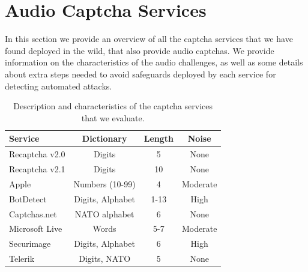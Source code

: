 \section{Audio Captcha Services}
\label{sec:services}

In this section we provide an overview of all the captcha services that we have found deployed in the wild,
that also provide audio captchas. We provide information on the characteristics of the audio challenges, as
well as some details about extra steps needed to avoid safeguards deployed by each service for 
detecting automated attacks.


\begin{table}[t]
\centering
\caption{Description and characteristics of the captcha services that we evaluate.}
\begin{tabular}{lccc}
\toprule
\textbf{Service}& \textbf{Dictionary}& \textbf{Length} & \textbf{Noise} \\
\hline
Recaptcha v2.0 & Digits & 5 & None \\
\rowcolor{Gray}
Recaptcha v2.1 & Digits & 10 & None \\
Apple & Numbers (10-99) & 4 & Moderate\\
\rowcolor{Gray}
BotDetect & Digits, Alphabet & 1-13 & High \\
Captchas.net & NATO alphabet & 6 & None \\
\rowcolor{Gray}
Microsoft Live & Words & 5-7 & Moderate \\
Securimage & Digits, Alphabet & 6 & High \\
\rowcolor{Gray}
Telerik & Digits, NATO & 5 & None \\
\bottomrule
\end{tabular}
\label{tab:services}
\end{table}

